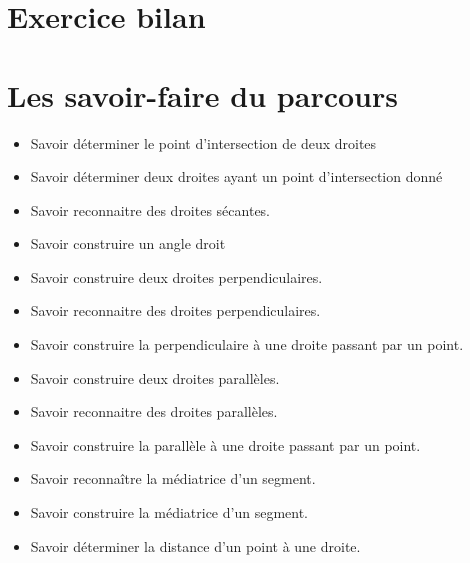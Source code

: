 \documentclass[a4paper,dvipsnames]{article}
\begin{document}
\section{Exercice bilan}


\section{Les savoir-faire du parcours}

\begin{CpsCol}
\begin{itemize}
\item Savoir déterminer le point d'intersection de deux droites
\item Savoir déterminer deux droites ayant un point d'intersection donné
\item Savoir reconnaitre des droites sécantes.
\item Savoir construire un angle droit
\item Savoir construire deux droites perpendiculaires.
\item Savoir reconnaitre des droites perpendiculaires.
\item Savoir construire la perpendiculaire à une droite passant par un point.
\item Savoir construire deux droites parallèles.
\item Savoir reconnaitre des droites parallèles.
\item Savoir construire la parallèle à une droite passant par un point.
\item Savoir reconnaître la médiatrice d'un segment. 
\item Savoir construire la médiatrice d'un segment. 
\item Savoir déterminer la distance d'un point à une droite.
\end{itemize}
\end{CpsCol}
\end{document}
